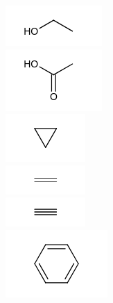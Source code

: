 \documentclass[10pt]{article}
\begin{document}
\includegraphics{smile-2977b4e51505100d21a20b04d7c9ad1091ed9cb3}\\
\includegraphics{smile-6394524a10b89e42a47e93f211cf05f3108d9dd3}\\
\includegraphics{smile-ad1e25332066f5859dedef005bb44a27eef79d45}\\
\includegraphics{smile-b7c819dea4ead953d2cd0f48eaf1542814857271}\\
\includegraphics{smile-7f8e23ebccf6a7ce64347a8c830055147c99caf6}\\
\includegraphics{smile-758f72acc6b1daf3f43294845632ae50fbc3c53c}
\end{document}
